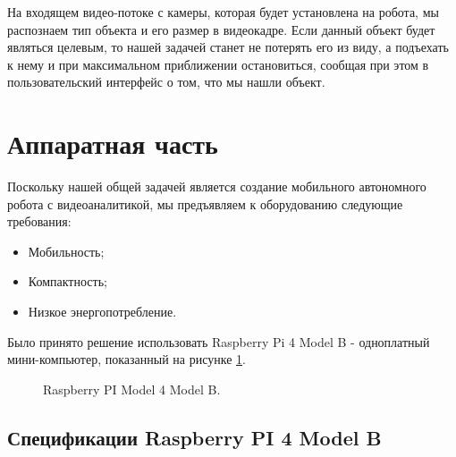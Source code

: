 \documentclass[14pt,a4paper]{scrartcl}
\begin{document}
			На входящем видео-потоке с камеры, которая будет установлена на робота, мы распознаем тип объекта и его размер в видеокадре. Если данный объект будет являться целевым, то нашей задачей станет не потерять его из виду, а подъехать к нему и при максимальном приближении остановиться, сообщая при этом в пользовательский интерфейс о том, что мы нашли объект.

\section{Аппаратная часть}

	Поскольку нашей общей задачей является создание мобильного автономного робота с видеоаналитикой, мы предъявляем к оборудованию следующие требования:
	\begin{itemize}
		\item Мобильность;
		\item Компактность;
		\item Низкое энергопотребление.
	\end{itemize}
	
	Было принято решение использовать Raspberry Pi 4 Model B - одноплатный мини-компьютер, показанный на рисунке \ref{fig:PI1}.
	
	\begin{figure}[h]
		\caption{Raspberry PI Model 4 Model B.}
		\label{fig:PI1}
	\end{figure}

	\subsection{Спецификации Raspberry PI 4 Model B}
	
\end{document}
